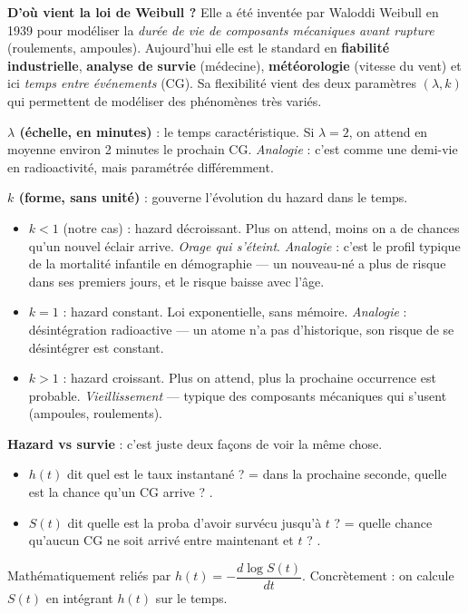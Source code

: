 \documentclass[11pt,a4paper]{article}
\begin{document}
\begin{compr}
\textbf{D'où vient la loi de Weibull ?} Elle a été inventée par Waloddi Weibull en 1939
pour modéliser la \emph{durée de vie de composants mécaniques avant rupture} (roulements,
ampoules). Aujourd'hui elle est le standard en \textbf{fiabilité industrielle},
\textbf{analyse de survie} (médecine), \textbf{météorologie} (vitesse du vent) et
ici \emph{temps entre événements} (CG). Sa flexibilité vient des deux paramètres
$(\lambda, k)$ qui permettent de modéliser des phénomènes très variés.

\textbf{$\lambda$ (échelle, en minutes)} : le temps caractéristique. Si $\lambda = 2$,
on attend en moyenne environ 2 minutes le prochain CG. \emph{Analogie} : c'est comme une
\og demi-vie \fg{} en radioactivité, mais paramétrée différemment.

\textbf{$k$ (forme, sans unité)} : gouverne l'évolution du hazard dans le temps.
\begin{itemize}[topsep=2pt]
    \item $k < 1$ (notre cas) : hazard décroissant. Plus on attend, moins on a de chances
    qu'un nouvel éclair arrive. \emph{Orage qui s'éteint}. \emph{Analogie} : c'est le
    profil typique de la \og mortalité infantile \fg{} en démographie — un nouveau-né a
    plus de risque dans ses premiers jours, et le risque baisse avec l'âge.
    \item $k = 1$ : hazard constant. Loi exponentielle, sans mémoire. \emph{Analogie} :
    désintégration radioactive — un atome n'a pas d'historique, son risque de se désintégrer
    est constant.
    \item $k > 1$ : hazard croissant. Plus on attend, plus la prochaine occurrence est
    probable. \emph{Vieillissement} — typique des composants mécaniques qui s'usent
    (ampoules, roulements).
\end{itemize}

\textbf{Hazard vs survie} : c'est juste deux façons de voir la même chose.
\begin{itemize}[topsep=2pt]
    \item $h(t)$ dit \og quel est le taux instantané ? \fg{} = \og dans la prochaine seconde,
    quelle est la chance qu'un CG arrive ? \fg{}.
    \item $S(t)$ dit \og quelle est la proba d'avoir survécu jusqu'à $t$ ? \fg{} = \og quelle
    chance qu'aucun CG ne soit arrivé entre maintenant et $t$ ? \fg{}.
\end{itemize}
Mathématiquement reliés par $h(t) = -\dfrac{d \log S(t)}{dt}$. Concrètement : on calcule $S(t)$
en intégrant $h(t)$ sur le temps.


\end{compr}
\end{document}
